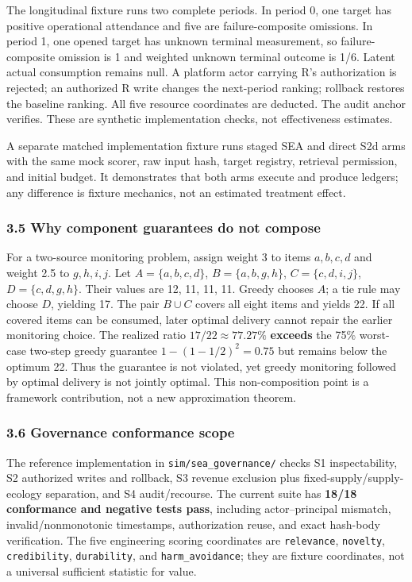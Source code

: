 \documentclass[
  11pt]{article}
\begin{document}
The longitudinal fixture runs two complete periods. In period 0, one
target has positive operational attendance and five are
failure-composite omissions. In period 1, one opened target has unknown
terminal measurement, so failure-composite omission is 1 and weighted
unknown terminal outcome is 1/6. Latent actual consumption remains null.
A platform actor carrying R's authorization is rejected; an authorized R
write changes the next-period ranking; rollback restores the baseline
ranking. All five resource coordinates are deducted. The audit anchor
verifies. These are synthetic implementation checks, not effectiveness
estimates.

A separate matched implementation fixture runs staged SEA and direct S2d
arms with the same mock scorer, raw input hash, target registry,
retrieval permission, and initial budget. It demonstrates that both arms
execute and produce ledgers; any difference is fixture mechanics, not an
estimated treatment effect.

\subsubsection{3.5 Why component guarantees do not
compose}\label{why-component-guarantees-do-not-compose}

For a two-source monitoring problem, assign weight 3 to items
\(a,b,c,d\) and weight 2.5 to \(g,h,i,j\). Let \(A=\{a,b,c,d\}\),
\(B=\{a,b,g,h\}\), \(C=\{c,d,i,j\}\), \(D=\{c,d,g,h\}\). Their values
are 12, 11, 11, 11. Greedy chooses \(A\); a tie rule may choose \(D\),
yielding 17. The pair \(B\cup C\) covers all eight items and yields 22.
If all covered items can be consumed, later optimal delivery cannot
repair the earlier monitoring choice. The realized ratio
\(17/22\approx77.27\%\) \textbf{exceeds} the 75\% worst-case two-step
greedy guarantee \(1-(1-1/2)^2=0.75\) but remains below the optimum 22.
Thus the guarantee is not violated, yet greedy monitoring followed by
optimal delivery is not jointly optimal. This non-composition point is a
framework contribution, not a new approximation theorem.

\subsubsection{3.6 Governance conformance
scope}\label{governance-conformance-scope}

The reference implementation in \texttt{sim/sea\_governance/} checks S1
inspectability, S2 authorized writes and rollback, S3 revenue exclusion
plus fixed-supply/supply-ecology separation, and S4 audit/recourse. The
current suite has \textbf{18/18 conformance and negative tests pass},
including actor--principal mismatch, invalid/nonmonotonic timestamps,
authorization reuse, and exact hash-body verification. The five
engineering scoring coordinates are \texttt{relevance},
\texttt{novelty}, \texttt{credibility}, \texttt{durability}, and
\texttt{harm\_avoidance}; they are fixture coordinates, not a universal
sufficient statistic for value.
\end{document}
